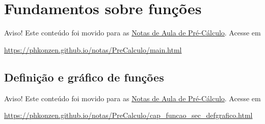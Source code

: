 
\chapter{Fundamentos sobre funções}\label{cap_funcao}
\thispagestyle{fancy}

\begin{center}
  Aviso! Este conteúdo foi movido para as \href{https://phkonzen.github.io/notas/PreCalculo/main.html}{Notas de Aula de Pré-Cálculo}. Acesse em

  \url{https://phkonzen.github.io/notas/PreCalculo/main.html}
\end{center}

\section{Definição e gráfico de funções}\label{cap_funcao_sec_defgrafico}

\begin{center}
  Aviso! Este conteúdo foi movido para as \href{https://phkonzen.github.io/notas/PreCalculo/main.html}{Notas de Aula de Pré-Cálculo}. Acesse em

  \url{https://phkonzen.github.io/notas/PreCalculo/cap_funcao_sec_defgrafico.html}
\end{center}




